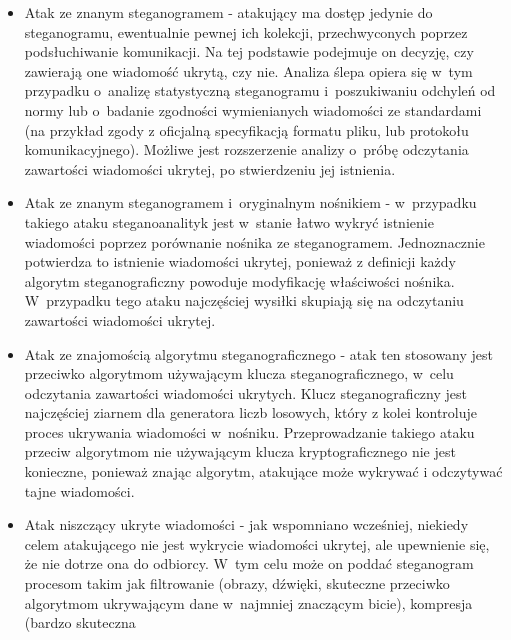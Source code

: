 \documentclass[a4paper, twoside, openright, 12pt]{report}
\begin{document}
        \begin{itemize}
            \item Atak ze znanym steganogramem - atakujący ma dostęp jedynie do
                steganogramu, ewentualnie pewnej ich kolekcji, przechwyconych poprzez
                podsłuchiwanie komunikacji. Na tej podstawie podejmuje on decyzję,
                czy zawierają one wiadomość ukrytą, czy nie. Analiza ślepa opiera
                się w~tym przypadku o~analizę statystyczną steganogramu i~poszukiwaniu
                odchyleń od normy lub o~badanie zgodności wymienianych wiadomości
                ze standardami (na przykład zgody z oficjalną specyfikacją formatu pliku,
                lub protokołu komunikacyjnego). Możliwe jest rozszerzenie
                analizy o~próbę odczytania zawartości wiadomości ukrytej, po stwierdzeniu
                jej istnienia.
            \item Atak ze znanym steganogramem i~oryginalnym nośnikiem - w~przypadku
                takiego ataku steganoanalityk jest w~stanie łatwo wykryć istnienie
                wiadomości poprzez porównanie nośnika ze steganogramem. Jednoznacznie
                potwierdza to istnienie wiadomości ukrytej, ponieważ z definicji
                każdy algorytm steganograficzny powoduje modyfikację właściwości
                nośnika. W~przypadku tego ataku najczęściej wysiłki skupiają się
                na odczytaniu zawartości wiadomości ukrytej.
            \item Atak ze znajomością algorytmu steganograficznego - atak ten
                stosowany jest przeciwko algorytmom używającym klucza steganograficznego,
                w~celu odczytania zawartości wiadomości ukrytych. Klucz steganograficzny
                jest najczęściej ziarnem dla generatora liczb losowych, który z
                kolei kontroluje proces ukrywania wiadomości w~nośniku. Przeprowadzanie
                takiego ataku przeciw algorytmom nie używającym klucza kryptograficznego
                nie jest konieczne, ponieważ znając algorytm, atakujące może wykrywać i
                odczytywać tajne wiadomości.
            \item Atak niszczący ukryte wiadomości - jak wspomniano wcześniej, niekiedy
                celem atakującego nie jest wykrycie wiadomości ukrytej, ale upewnienie
                się, że nie dotrze ona do odbiorcy. W~tym celu może on poddać steganogram
                procesom takim jak filtrowanie (obrazy, dźwięki, skuteczne przeciwko
                algorytmom ukrywającym dane w~najmniej znaczącym bicie), kompresja (bardzo skuteczna

\end{itemize}
\end{document}

